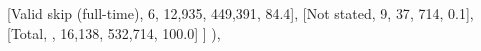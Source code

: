 \documentclass[
  11pt,
  a4paper,
]{article}
\newenvironment{Shaded}{\begin{snugshade}}{\end{snugshade}}
\newcommand{\NormalTok}[1]{\textcolor[rgb]{0.00,0.23,0.31}{#1}}
\newcommand{\StringTok}[1]{\textcolor[rgb]{0.13,0.47,0.30}{#1}}
\begin{document}
\begin{Shaded}
\begin{Highlighting}[]
\NormalTok{                [}\StringTok{\textquotesingle{}Valid skip (full{-}time)\textquotesingle{}}\NormalTok{, }\StringTok{\textquotesingle{}6\textquotesingle{}}\NormalTok{, }\StringTok{\textquotesingle{}12,935\textquotesingle{}}\NormalTok{, }\StringTok{\textquotesingle{}449,391\textquotesingle{}}\NormalTok{, }\StringTok{\textquotesingle{}84.4\textquotesingle{}}\NormalTok{],}
\NormalTok{                [}\StringTok{\textquotesingle{}Not stated\textquotesingle{}}\NormalTok{, }\StringTok{\textquotesingle{}9\textquotesingle{}}\NormalTok{, }\StringTok{\textquotesingle{}37\textquotesingle{}}\NormalTok{, }\StringTok{\textquotesingle{}714\textquotesingle{}}\NormalTok{, }\StringTok{\textquotesingle{}0.1\textquotesingle{}}\NormalTok{],}
\NormalTok{                [}\StringTok{\textquotesingle{}Total\textquotesingle{}}\NormalTok{, }\StringTok{\textquotesingle{}\textquotesingle{}}\NormalTok{, }\StringTok{\textquotesingle{}16,138\textquotesingle{}}\NormalTok{, }\StringTok{\textquotesingle{}532,714\textquotesingle{}}\NormalTok{, }\StringTok{\textquotesingle{}100.0\textquotesingle{}}\NormalTok{]}
\NormalTok{                ]}
\NormalTok{            ),}
        

\end{Highlighting}
\end{Shaded}
\end{document}
